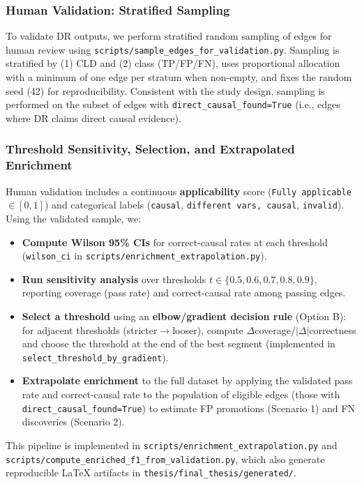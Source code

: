 \subsubsection{Human Validation: Stratified Sampling}
To validate DR outputs, we perform stratified random sampling of edges for human review using \texttt{scripts/sample\_edges\_for\_validation.py}. Sampling is stratified by (1) CLD and (2) class (TP/FP/FN), uses proportional allocation with a minimum of one edge per stratum when non-empty, and fixes the random seed (42) for reproducibility. Consistent with the study design, sampling is performed on the subset of edges with \texttt{direct\_causal\_found=True} (i.e., edges where DR claims direct causal evidence).

\subsubsection{Threshold Sensitivity, Selection, and Extrapolated Enrichment}
Human validation includes a continuous \textbf{applicability} score (\texttt{Fully applicable} \(\in[0,1]\)) and categorical labels (\texttt{causal}, \texttt{different vars, causal}, \texttt{invalid}). Using the validated sample, we:
\begin{itemize}[noitemsep]
    \item \textbf{Compute Wilson 95\% CIs} for correct-causal rates at each threshold (\texttt{wilson\_ci} in \texttt{scripts/enrichment\_extrapolation.py}).
    \item \textbf{Run sensitivity analysis} over thresholds \(t\in\{0.5,0.6,0.7,0.8,0.9\}\), reporting coverage (pass rate) and correct-causal rate among passing edges.
    \item \textbf{Select a threshold} using an \textbf{elbow/gradient decision rule} (Option B): for adjacent thresholds (stricter\(\rightarrow\)looser), compute \(\Delta\)coverage$/|\Delta|$correctness and choose the threshold at the end of the best segment (implemented in \texttt{select\_threshold\_by\_gradient}).
    \item \textbf{Extrapolate enrichment} to the full dataset by applying the validated pass rate and correct-causal rate to the population of eligible edges (those with \texttt{direct\_causal\_found=True}) to estimate FP promotions (Scenario 1) and FN discoveries (Scenario 2).
\end{itemize}
This pipeline is implemented in \texttt{scripts/enrichment\_extrapolation.py} and \texttt{scripts/compute\_enriched\_f1\_from\_validation.py}, which also generate reproducible LaTeX artifacts in \texttt{thesis/final\_thesis/generated/}.

